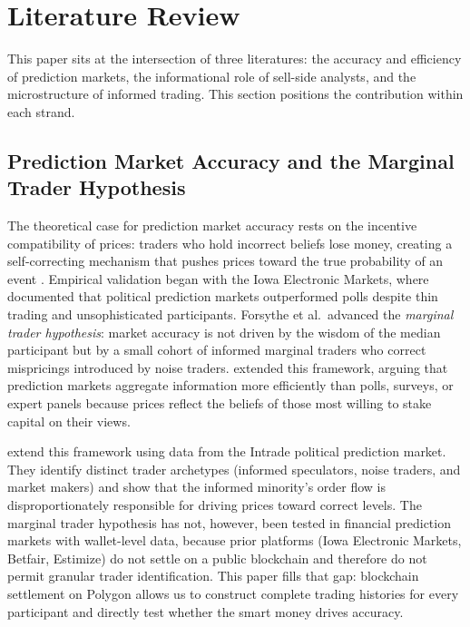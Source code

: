 \documentclass[11pt]{article}
\begin{document}
\section{Literature Review} \label{sec:lit}

This paper sits at the intersection of three literatures: the accuracy and efficiency of prediction markets, the informational role of sell-side analysts, and the microstructure of informed trading. This section positions the contribution within each strand.

\subsection{Prediction Market Accuracy and the Marginal Trader Hypothesis}

The theoretical case for prediction market accuracy rests on the incentive compatibility of prices: traders who hold incorrect beliefs lose money, creating a self-correcting mechanism that pushes prices toward the true probability of an event \citep{hayek1945use, arrow2008promise}. Empirical validation began with the Iowa Electronic Markets, where \citet{forsythe1992anatomy} documented that political prediction markets outperformed polls despite thin trading and unsophisticated participants. Forsythe et al.\ advanced the \textit{marginal trader hypothesis}: market accuracy is not driven by the wisdom of the median participant but by a small cohort of informed marginal traders who correct mispricings introduced by noise traders. \citet{wolfers2004prediction} extended this framework, arguing that prediction markets aggregate information more efficiently than polls, surveys, or expert panels because prices reflect the beliefs of those most willing to stake capital on their views.

\citet{rothschild2016trading} extend this framework using data from the Intrade political prediction market. They identify distinct trader archetypes (informed speculators, noise traders, and market makers) and show that the informed minority's order flow is disproportionately responsible for driving prices toward correct levels. The marginal trader hypothesis has not, however, been tested in financial prediction markets with wallet-level data, because prior platforms (Iowa Electronic Markets, Betfair, Estimize) do not settle on a public blockchain and therefore do not permit granular trader identification. This paper fills that gap: blockchain settlement on Polygon allows us to construct complete trading histories for every participant and directly test whether the smart money drives accuracy.
\end{document}
